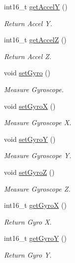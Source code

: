 \begin{DoxyCompactItemize}
int16\+\_\+t \mbox{\hyperlink{class_m_p_u6050_a5a6328a583b3eabcd69c63f7b3e5fc78}{get\+AccelY}} ()
\begin{DoxyCompactList}\small\item\em Return Accel Y. \end{DoxyCompactList}\item 
int16\+\_\+t \mbox{\hyperlink{class_m_p_u6050_a67d656ca5338e7c4f791c19838ae7c53}{get\+AccelZ}} ()
\begin{DoxyCompactList}\small\item\em Return Accel Z. \end{DoxyCompactList}\item 
void \mbox{\hyperlink{class_m_p_u6050_aaf1a878aa47a35907b583beb4cbcff23}{set\+Gyro}} ()
\begin{DoxyCompactList}\small\item\em Measure Gyroscope. \end{DoxyCompactList}\item 
void \mbox{\hyperlink{class_m_p_u6050_a46b0b1dc134fd76791f84b577c4cf4d2}{set\+GyroX}} ()
\begin{DoxyCompactList}\small\item\em Measure Gyroscope X. \end{DoxyCompactList}\item 
void \mbox{\hyperlink{class_m_p_u6050_aeaf72bc3ae93a553221dbbc0a2aaa3c4}{set\+GyroY}} ()
\begin{DoxyCompactList}\small\item\em Measure Gyroscope Y. \end{DoxyCompactList}\item 
void \mbox{\hyperlink{class_m_p_u6050_a710f9cf1589d8e4dcd26bc5e3bc55e66}{set\+GyroZ}} ()
\begin{DoxyCompactList}\small\item\em Measure Gyroscope Z. \end{DoxyCompactList}\item 
int16\+\_\+t \mbox{\hyperlink{class_m_p_u6050_a6da3ae068a2bc895eb24e19c073eef97}{get\+GyroX}} ()
\begin{DoxyCompactList}\small\item\em Return Gyro X. \end{DoxyCompactList}\item 
int16\+\_\+t \mbox{\hyperlink{class_m_p_u6050_a596664a8580696b30b614285ed8cb7fe}{get\+GyroY}} ()
\begin{DoxyCompactList}\small\item\em Return Gyro Y. \end{DoxyCompactList}\item 

\end{DoxyCompactItemize}

